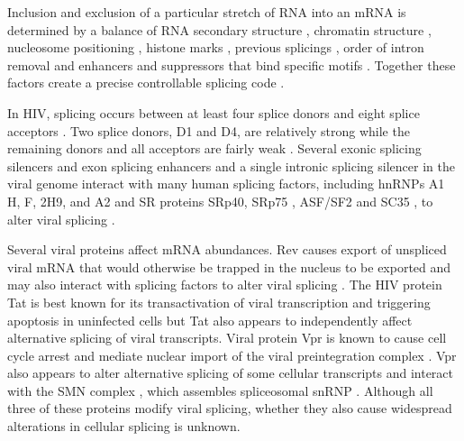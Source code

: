 \documentclass[../sherrill-Mix_thesis.tex]{subfiles}
\begin{document}
	Inclusion and exclusion of a particular stretch of RNA into an mRNA is determined by a balance of RNA secondary structure \citep{Buratti2004,Jablonski2008,Shepard2008}, chromatin structure \citep{Allo2009}, nucleosome positioning \citep{Tilgner2009}, histone marks \citep{Schwartz2009}, previous splicings \citep{Crabb2010}, order of intron removal \citep{Takahara2002,Mata2010} and enhancers \citep{Zahler1993} and suppressors \citep{Smith2000} that bind specific motifs \citep{Ule2006}. Together these factors create a precise controllable splicing code \citep{Barash2010,Xiong2011,Witten2011}.  

	 In HIV, splicing occurs between at least four splice donors and eight splice acceptors \citep{Stoltzfus2009}. Two splice donors, D1 and D4, are relatively strong while the remaining donors and all acceptors are fairly weak \citep{O'Reilly1995}. Several exonic splicing silencers \citep{Amendt1994,Levengood2012} and exon splicing enhancers \citep{Caputi2004,Asang2008} and a single intronic splicing silencer \citep{Tange2001} in the viral genome interact with many human splicing factors, including hnRNPs A1 \citep{Tange2001, Levengood2012} H, F, 2H9, and A2 \citep{Jablonski2008} and SR proteins SRp40\citep{Caputi2004,Tranell2010}, SRp75 \citep{Tranell2010}, ASF/SF2 \citep{Caputi2004} and SC35 \citep{Jablonski2008}, to alter viral splicing \citep{Stoltzfus2006,Stoltzfus2009}.

	Several viral proteins affect mRNA abundances. Rev causes export of unspliced viral mRNA that would otherwise be trapped in the nucleus \citep{Legrain1989} to be exported \citep{Fischer1994,Pollard1998} and may also interact with splicing factors to alter viral splicing \citep{Tange1996}. The HIV protein Tat is best known for its transactivation of viral transcription \citep{Sodroski1985,Jones1994} and triggering apoptosis in uninfected cells \citep{McCloskey1997,Campbell2004} but Tat also appears to independently affect alternative splicing of viral transcripts\citep{Berro2006,Bohne2007,Jablonski2010,Miller2011}. Viral protein Vpr is known to cause cell cycle arrest \citep{Rogel1995} and mediate nuclear import of the viral preintegration complex \citep{Fouchier1998}. Vpr also appears to alter alternative splicing of some cellular transcripts \citep{Kuramitsu2005,Hashizume2007} and interact with the SMN complex \citep{Jager2012}, which assembles spliceosomal snRNP \citep{Gubitz2004}. Although all three of these proteins modify viral splicing, whether they also cause widespread alterations in cellular splicing is unknown.
\end{document}
